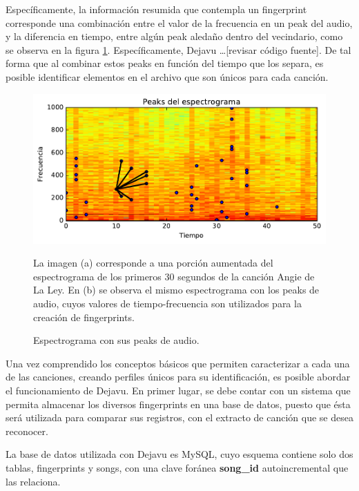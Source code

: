 Específicamente, la información resumida que contempla un fingerprint corresponde una combinación entre el valor de la frecuencia en un peak del audio, y la diferencia en tiempo, entre algún peak aledaño dentro del vecindario, como se observa en la figura \ref{fig:LineasDePeaks}. Específicamente, Dejavu …[revisar código fuente]. De tal forma que al combinar estos peaks en función del tiempo que los separa, es posible identificar elementos en el archivo que son únicos para cada canción.

\begin{figure}[h!]
    \centering
    \includegraphics[scale=0.7]{graficos/LineasDePeaks.pdf}
    \caption{Espectrograma con sus peaks de audio.}{La imagen (a) corresponde a una porción aumentada del espectrograma de los primeros 30 segundos de la canción Angie de La Ley. En (b) se observa el mismo espectrograma con los peaks de audio, cuyos valores de tiempo-frecuencia son utilizados para la creación de fingerprints.}
    \label{fig:LineasDePeaks}
\end{figure}

Una vez comprendido los conceptos básicos que permiten caracterizar a cada una de las canciones, creando perfiles únicos para su identificación, es posible abordar el funcionamiento de Dejavu. En primer lugar, se debe contar con un sistema que permita almacenar los diversos fingerprints en una base de datos, puesto que ésta será utilizada para comparar sus registros, con el extracto de canción que se desea reconocer.



La base de datos utilizada con Dejavu es MySQL, cuyo esquema contiene solo dos tablas, fingerprints y songs, con una clave foránea \textbf{song\_id} autoincremental que las relaciona.

